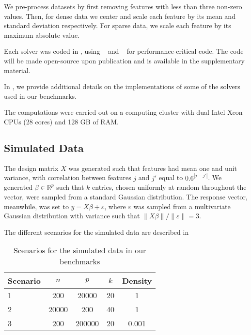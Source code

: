 We pre-process datasets by first removing features with less than three non-zero values. Then, for dense data we center and scale each feature by its mean and standard deviation respectively.
For sparse data, we scale each feature by its maximum absolute value.

Each solver was coded in , using ~\parencite{harris2020} and ~\parencite{lam2015} for performance-critical code.
The code will be made open-source upon publication and is available in the supplementary material.

In , we provide additional details on the implementations of some of the solvers used in our benchmarks.

The computations were carried out on a computing cluster with dual Intel Xeon CPUs (28 cores) and 128 GB of RAM.

\subsection{Simulated Data}
\label{sec:experiments-real-data}

The design matrix $X$ was generated such that features had mean one and unit variance, with correlation between features $j$ and $j'$ equal to $0.6^{|j-j'|}$.
We generated \(\beta \in \mathbb{R}^p\) such that \(k\) entries, chosen uniformly at random throughout the vector, were sampled from a standard Gaussian distribution.
The response vector, meanwhile, was set to $y=X\beta + \varepsilon$, where
$\varepsilon$ was sampled from a multivariate Gaussian distribution with variance such that $\lVert X\beta\rVert / \lVert \varepsilon \rVert = 3$.

The different scenarios for the simulated data are described in 

\begin{table}[hbt]
  \centering
  \caption{Scenarios for the simulated data in our benchmarks}
  \label{tab:simulated-data}
  \begin{tabular}{
      l
      S[table-format=5.0,round-mode=off]
      S[table-format=7.0,round-mode=off]
      S[table-format=2.0,round-mode=off]
      S[table-format=1.3,round-mode=off]
    }
    \toprule
    {Scenario} & {\(n\)} & {\(p\)} & {\(k\)} & {Density} \\           & 200     & 20000   & 20      & 1         \\
    2          & 20000   & 200     & 40      & 1         \\
    3          & 200     & 200000 & 20      & 0.001     \\ \bottomrule
  \end{tabular}
\end{table}

